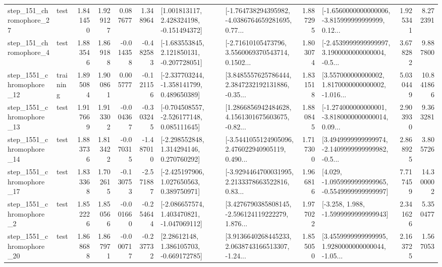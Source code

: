 \begin{tabular}{llrrrrllrlrr}
  step\_151\_chromophore\_27 &      test &      1.841450 &    1.929127 &      0.087677 &  1.348964 &    [1.001813117, 2.428324198, -0.151494372] &  [-1.764738294395982, -4.0386764659281695, 0.77... &       1.887295 &  [-1.6560000000000006, -3.815999999999999, 0.12... &            1.925341 &          8.272391 \\
   step\_151\_chromophore\_4 &      test &      1.883546 &    1.869188 &     -0.014358 & -0.482583 &   [-1.683553845, 2.121850131, -0.207728051] &  [-2.71610105473796, 3.5560069370543714, 0.1502... &       1.803074 &  [-2.4539999999999997, 3.1900000000000004, -0.5... &            3.678282 &          9.887800 \\
 step\_1551\_chromophore\_12 &  training &      1.895084 &    1.900861 &      0.005777 & -0.121156 &   [-2.337703244, -1.358141799, 0.489650389] &  [3.8485557625786444, 2.3847232192131886, -0.35... &       1.831518 &  [3.557000000000002, 1.8170000000000002, -1.016... &            5.030449 &         10.841866 \\
 step\_1551\_chromophore\_13 &      test &      1.917669 &    1.913302 &     -0.004367 & -0.303245 &   [-0.704508557, -2.526177148, 0.085111645] &  [1.2866856942484628, 4.1561301675603675, -0.82... &       1.880845 &  [-1.274000000000001, -3.8180000000000014, 0.09... &            2.903930 &          9.363281 \\
 step\_1551\_chromophore\_14 &      test &      1.883736 &    1.813422 &     -0.070315 & -1.487010 &    [-2.298552848, 1.314294146, 0.270760292] &  [-3.5441055124905096, 2.476022940905119, 0.490... &       1.717300 &  [3.4949999999999974, -2.1409999999999982, -0.5... &            2.868925 &          3.805726 \\
 step\_1551\_chromophore\_17 &      test &      1.833368 &    1.702615 &     -0.130753 & -2.571887 &    [-2.425197906, 1.027650563, 0.389750971] &  [-3.9294464700031995, 2.2133378663522816, 0.83... &       1.966816 &  [4.029, -1.0959999999999965, -0.5549999999999997] &            7.717459 &         14.300002 \\
  step\_1551\_chromophore\_2 &      test &      1.852226 &    1.850566 &     -0.001660 & -0.254644 &   [-2.086657574, 1.403470821, -1.047069112] &  [3.4276790385808145, -2.596124119222279, 1.876... &       1.977022 &               [-3.258, 1.988, -1.5999999999999943] &            2.341626 &          5.350477 \\
 step\_1551\_chromophore\_20 &      test &      1.868688 &    1.867971 &     -0.000717 & -0.237732 &     [2.28612148, 1.386105703, -0.669172785] &  [3.9136640268445233, 2.0638743166513307, -1.24... &       1.855050 &  [3.4559999999999995, 1.9280000000000044, -1.05... &            2.163725 &          1.567053 \\

\end{tabular}
